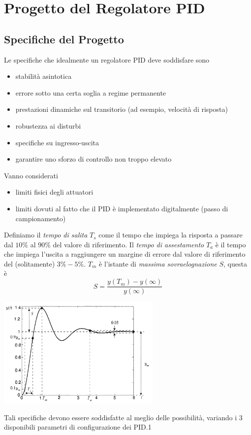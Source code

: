 \documentclass[10pt, letterpaper]{report}
\begin{document}
\section{Progetto del Regolatore PID}
\subsection{Specifiche del Progetto}
Le specifiche che idealmente un regolatore PID deve soddisfare sono\begin{itemize}
    \item stabilità asintotica 
    \item errore sotto una certa soglia a regime permanente 
    \item prestazioni dinamiche sul transitorio (ad esempio, velocità di risposta)
    \item robustezza ai disturbi 
    \item specifiche su ingresso-uscita 
    \item garantire uno sforzo di controllo non troppo elevato 
\end{itemize}
Vanno considerati \begin{itemize}
    \item limiti fisici degli attuatori 
    \item limiti dovuti al fatto che il PID è implementato digitalmente (passo di campionamento)
\end{itemize}
Definiamo il \textit{tempo di salita} $T_s$ come il tempo che impiega la risposta a passare dal $10\%$ al $90\%$ del valore di riferimento.\acc 
Il \textit{tempo di assestamento} $T_a$ è il tempo che impiega l'uscita a raggiungere un margine di errore dal valore di riferimento del (solitamente) $3\%-5\%$.\acc 
$T_m$ è l'istante di \textit{massima sovraelognazione} $S$, questa è 
$$S=\frac{y(T_m)-y(\infty)}{y(\infty)} $$
\begin{center}
    \includegraphics[width=0.6\textwidth]{images/secifiche.png} 
\end{center}
Tali specifiche devono essere soddisfatte al meglio delle possibilità, variando i 3 disponibili parametri di configurazione dei PID.1
\end{document}
